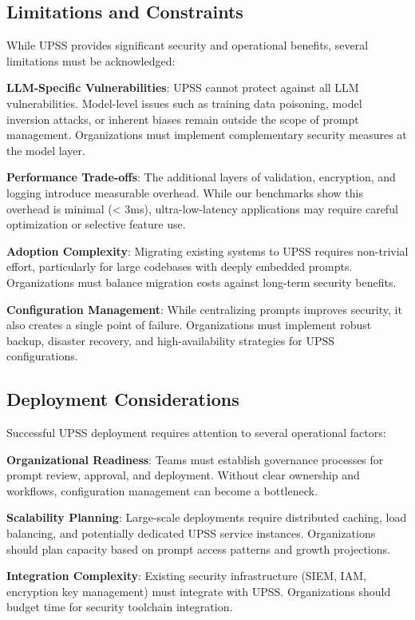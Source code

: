 \subsection{Limitations and Constraints}

While UPSS provides significant security and operational benefits, several limitations must be acknowledged:

\textbf{LLM-Specific Vulnerabilities}: UPSS cannot protect against all LLM vulnerabilities. Model-level issues such as training data poisoning, model inversion attacks, or inherent biases remain outside the scope of prompt management. Organizations must implement complementary security measures at the model layer.

\textbf{Performance Trade-offs}: The additional layers of validation, encryption, and logging introduce measurable overhead. While our benchmarks show this overhead is minimal (< 3ms), ultra-low-latency applications may require careful optimization or selective feature use.

\textbf{Adoption Complexity}: Migrating existing systems to UPSS requires non-trivial effort, particularly for large codebases with deeply embedded prompts. Organizations must balance migration costs against long-term security benefits.

\textbf{Configuration Management}: While centralizing prompts improves security, it also creates a single point of failure. Organizations must implement robust backup, disaster recovery, and high-availability strategies for UPSS configurations.

\subsection{Deployment Considerations}

Successful UPSS deployment requires attention to several operational factors:

\textbf{Organizational Readiness}: Teams must establish governance processes for prompt review, approval, and deployment. Without clear ownership and workflows, configuration management can become a bottleneck.

\textbf{Scalability Planning}: Large-scale deployments require distributed caching, load balancing, and potentially dedicated UPSS service instances. Organizations should plan capacity based on prompt access patterns and growth projections.

\textbf{Integration Complexity}: Existing security infrastructure (SIEM, IAM, encryption key management) must integrate with UPSS. Organizations should budget time for security toolchain integration.


